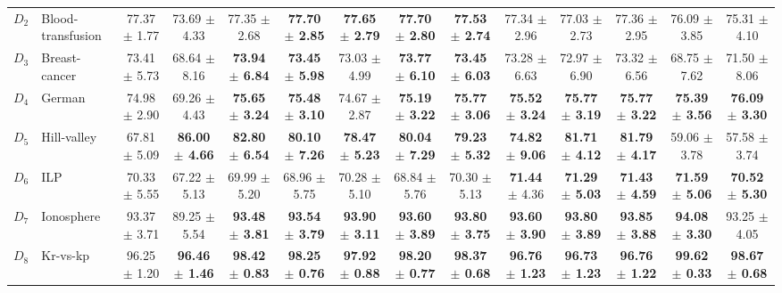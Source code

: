 {\begin{landscape}
\begin{table}[!ht]
\begin{adjustbox}{width=1.5\textwidth,center=1.5\textwidth}
\begin{tabular}{rlcc|cccccccc|cc}
\rule{0pt}{17pt}$D_2$ & Blood-transfusion & 77.37 $\pm$ 1.77 & 73.69 $\pm$ 4.33	 & 77.35 $\pm$ 2.68 &\textbf{ 77.70 $\pm$ 2.85} & \textbf{77.65 $\pm$ 2.79} & \textbf{77.70 $\pm$ 2.80} & \textbf{77.53 $\pm$ 2.74} & 77.34 $\pm$ 2.96  & 77.03 $\pm$ 2.73  & 77.36 $\pm$ 2.95 & 76.09 $\pm$ 3.85  &75.31 $\pm$ 4.10  \\ 
\rule{0pt}{17pt}$D_3$ & Breast-cancer & 73.41 $\pm$ 5.73  & 68.64 $\pm$ 8.16 &\textbf{ 73.94 $\pm$ 6.84 }  & \textbf{73.45 $\pm$ 5.98}  & 73.03 $\pm$ 4.99 &\textbf{ 73.77 $\pm$ 6.10} & \textbf{73.45 $\pm$ 6.03}  & 73.28 $\pm$ 6.63 & 72.97 $\pm$ 6.90 & 73.32 $\pm$ 6.56  & 68.75 $\pm$ 7.62  & 71.50 $\pm$ 8.06 \\ 
\rule{0pt}{17pt}$D_4$ & German & 74.98 $\pm$ 2.90 & 69.26 $\pm$ 4.43 & \textbf{75.65 $\pm$ 3.24} & \textbf{75.48 $\pm$ 3.10} & 74.67 $\pm$ 2.87 & \textbf{75.19 $\pm$ 3.22}  & \textbf{75.77 $\pm$ 3.06} & \textbf{75.52 $\pm$ 3.24} & \textbf{75.77 $\pm$ 3.19}  & \textbf{75.77 $\pm$ 3.22} & \textbf{75.39 $\pm$ 3.56 }& \textbf{76.09 $\pm$ 3.30} \\ 
\rule{0pt}{17pt}$D_5$ & Hill-valley & 67.81 $\pm$ 5.09 & \textbf{86.00 $\pm$ 4.66}  & \textbf{82.80 $\pm$ 6.54}  & \textbf{80.10 $\pm$ 7.26} & \textbf{78.47 $\pm$ 5.23} & \textbf{80.04 $\pm$ 7.29} & \textbf{79.23 $\pm$ 5.32} & \textbf{74.82 $\pm$ 9.06} & \textbf{81.71 $\pm$ 4.12} & \textbf{81.79 $\pm$ 4.17} & 59.06 $\pm$ 3.78 & 57.58 $\pm$ 3.74 \\ 
\rule{0pt}{17pt}$D_6$ & ILP & 70.33 $\pm$ 5.55  & 67.22 $\pm$ 5.13  & 69.99 $\pm$ 5.20 & 68.96 $\pm$ 5.75 & 70.28 $\pm$ 5.10  & 68.84 $\pm$ 5.76 & 70.30 $\pm$ 5.13 &\textbf{71.44} $\pm$ 4.36 & \textbf{71.29 $\pm$ 5.03} &  \textbf{71.43 $\pm$ 4.59} & \textbf{71.59 $\pm$ 5.06}  & \textbf{70.52 $\pm$ 5.30} \\ 
\rule{0pt}{17pt}$D_7$ & Ionosphere & 93.37 $\pm$ 3.71 & 89.25 $\pm$ 5.54  & \textbf{93.48 $\pm$ 3.81}   & \textbf{93.54 $\pm$ 3.79} & \textbf{93.90 $\pm$ 3.11} & \textbf{93.60 $\pm$ 3.89} & \textbf{93.80 $\pm$ 3.75} & \textbf{93.60 $\pm$ 3.90}  & \textbf{93.80 $\pm$ 3.89} & \textbf{93.85 $\pm$ 3.88} & \textbf{94.08 $\pm$ 3.30}  & 93.25 $\pm$ 4.05 \\ 
\rule{0pt}{17pt}$D_8$ & Kr-vs-kp & 96.25 $\pm$ 1.20 & \textbf{96.46 $\pm$ 1.46} & \textbf{98.42 $\pm$ 0.83} & \textbf{98.25 $\pm$ 0.76} & \textbf{97.92 $\pm$ 0.88} & \textbf{98.20 $\pm$ 0.77} & \textbf{98.37 $\pm$ 0.68} & \textbf{96.76 $\pm$ 1.23} & \textbf{96.73 $\pm$ 1.23} & \textbf{96.76 $\pm$ 1.22 }& \textbf{99.62 $\pm$ 0.33}  & \textbf{98.67 $\pm$ 0.68}  \\  

\end{tabular}
\end{adjustbox}
\end{table}
\end{landscape}}
